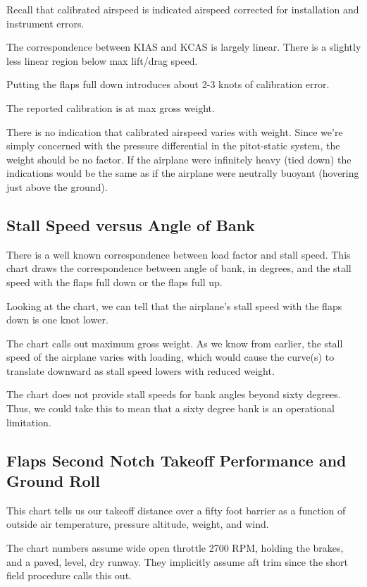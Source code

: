 Recall that calibrated airspeed is indicated airspeed corrected for installation and instrument errors.

The correspondence between KIAS and KCAS is largely linear. There is a slightly less linear region below max lift/drag speed.

Putting the flaps full down introduces about 2-3 knots of calibration error.

The reported calibration is at max gross weight.

There is no indication that calibrated airspeed varies with weight. Since we're simply concerned with the pressure differential in the pitot-static system, the weight should be no factor. If the airplane were infinitely heavy (tied down) the indications would be the same as if the airplane were neutrally buoyant (hovering just above the ground).

\subsection{Stall Speed versus Angle of Bank}

There is a well known correspondence between load factor and stall speed. This chart draws the correspondence between angle of bank, in degrees, and the stall speed with the flaps full down or the flaps full up.

Looking at the chart, we can tell that the airplane's stall speed with the flaps down is one knot lower.

The chart calls out maximum gross weight. As we know from earlier, the stall speed of the airplane varies with loading, which would cause the curve(s) to translate downward as stall speed lowers with reduced weight.

The chart does not provide stall speeds for bank angles beyond sixty degrees. Thus, we could take this to mean that a sixty degree bank is an operational limitation.

\subsection{Flaps Second Notch Takeoff Performance and Ground Roll}

This chart tells us our takeoff distance over a fifty foot barrier as a function of outside air temperature, pressure altitude, weight, and wind.

The chart numbers assume wide open throttle 2700 RPM, holding the brakes, and a paved, level, dry runway. They implicitly assume aft trim since the short field procedure calls this out.

